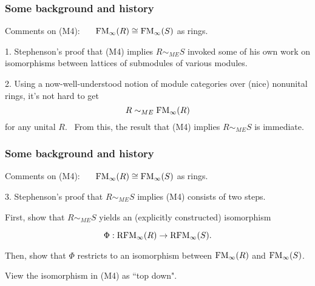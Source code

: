 \documentclass{beamer}
\begin{document}
\begin{frame}
\frametitle{Some background and history}
\footnotesize
\begin{center}
Comments on (M4):
  \ \ \   ${\rm FM}_\infty(R) \cong {\rm FM}_\infty(S)$ as rings.  
  \end{center}
\normalsize

\medskip

1.   Stephenson's proof that (M4) implies $R \sim_{ME} S$  invoked some of his own work on isomorphisms between lattices of submodules of various modules.   

\bigskip
\pause

2.    Using a now-well-understood notion of module categories over (nice) nonunital rings, it's not hard to get $$R \sim_{ME}  {\rm FM}_\infty(R) $$ for any unital $R$.  \ From this, the result that  (M4) implies $R \sim_{ME} S$ is immediate.   


\end{frame}





\begin{frame}
\frametitle{Some background and history}
\footnotesize
\begin{center}
Comments on (M4):
  \ \ \   ${\rm FM}_\infty(R) \cong {\rm FM}_\infty(S)$ as rings.  
  \end{center}
\normalsize

\smallskip

3.   Stephenson's proof that $R \sim_{ME} S$ implies (M4)  consists of two steps.

\medskip

 First, show that $R \sim_{ME} S$ yields an (explicitly constructed)  isomorphism  

 $$ \Phi:  {\rm RFM}_\infty(R) \to {\rm RFM}_\infty(S).$$
 
\pause

Then, show that $\Phi$ restricts to an isomorphism between ${\rm FM}_\infty(R)$ and ${\rm FM}_\infty(S)$.   
 
  \medskip
 
 View the isomorphism in (M4) as ``top down".   

\end{frame}
\end{document}
